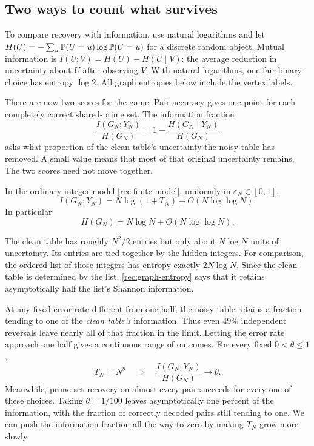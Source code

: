 \subsection{Two ways to count what survives}

To compare recovery with information, use natural logarithms and let
$H(U)=-\sum_u\mathbb P(U=u)\log\mathbb P(U=u)$ for a discrete random object.
Mutual information is $I(U;V)=H(U)-H(U\mid V)$: the average reduction
in uncertainty about $U$ after observing $V$. With natural logarithms,
one fair binary choice has entropy $\log2$. All graph entropies below
include the vertex labels.

There are now two scores for the game. Pair accuracy gives one point
for each completely correct shared-prime set. The information fraction
\[
 \frac{I(G_N;Y_N)}{H(G_N)}
 =1-\frac{H(G_N\mid Y_N)}{H(G_N)}
\]
asks what proportion of the clean table's uncertainty the noisy table
has removed. A small value means that most of that original uncertainty
remains. The two scores need not move together.

\begin{theorem}\label{rec:information}
In the ordinary-integer model \eqref{rec:finite-model}, uniformly in
$\varepsilon_N\in[0,1]$,
\begin{equation}\label{rec:information-law}
 I(G_N;Y_N)=N\log(1+T_N)+O(N\log\log N).
\end{equation}
In particular
\begin{equation}\label{rec:graph-entropy}
 H(G_N)=N\log N+O(N\log\log N).
\end{equation}
\end{theorem}

The clean table has roughly $N^2/2$ entries but only about $N\log N$
units of uncertainty. Its entries are tied together by the hidden
integers. For comparison, the ordered list of those integers has entropy
exactly $2N\log N$. Since the clean table is determined by the list,
\eqref{rec:graph-entropy} says that it retains asymptotically half the
list's Shannon information.

At any fixed error rate different from one half, the noisy table retains
a fraction tending to one of the \emph{clean table's} information.
Thus even $49\%$ independent reversals leave nearly all of that fraction
in the limit. Letting the error rate approach one half gives a continuous
range of outcomes. For every fixed $0<\theta\le1$,
\[
 T_N=N^\theta
 \quad\Longrightarrow\quad
 \frac{I(G_N;Y_N)}{H(G_N)}\longrightarrow\theta.
\]
Meanwhile, prime-set recovery on almost every pair succeeds for every
one of these choices. Taking $\theta=1/100$ leaves asymptotically one
percent of the information, with the fraction of correctly decoded
pairs still tending to one. We can push the information fraction all
the way to zero by making $T_N$ grow more slowly.

